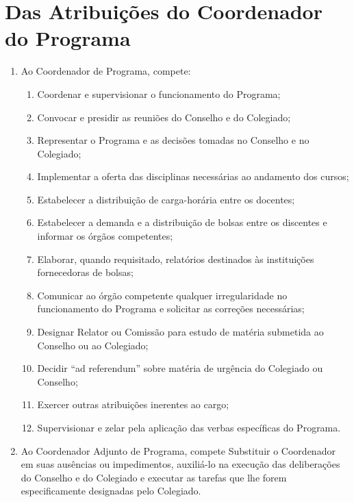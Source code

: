 \documentclass{article}
\newcommand{\grupoMenor}{Colegiado\xspace}
\newcommand{\grupoMaior}{Conselho\xspace}
\begin{document}
\section{Das Atribuições do Coordenador do Programa}
\begin{enumerate}
	\item Ao Coordenador de Programa, compete:
	\begin{enumerate}[label=\Roman*]
		\item Coordenar e supervisionar o funcionamento do Programa;
		\item Convocar e presidir as reuniões do \grupoMaior e do \grupoMenor;
		\item Representar o Programa e as decisões tomadas no \grupoMaior e no \grupoMenor;
		\item Implementar a oferta das disciplinas necessárias ao andamento dos cursos;
		\item Estabelecer a distribuição de carga-horária entre os docentes;
		\item Estabelecer a demanda e a distribuição de bolsas entre os discentes e informar os órgãos competentes;
		\item Elaborar, quando requisitado, relatórios destinados às instituições fornecedoras de bolsas;
		\item Comunicar ao órgão competente qualquer irregularidade no funcionamento do Programa e solicitar as correções necessárias;
		\item Designar Relator ou Comissão para estudo de matéria submetida ao \grupoMaior ou ao \grupoMenor;
		\item Decidir ``ad referendum'' sobre matéria de urgência do \grupoMenor ou \grupoMaior;
		\item Exercer outras atribuições inerentes ao cargo;
		\item Supervisionar e zelar pela aplicação das verbas específicas do Programa.
	\end{enumerate}
	\item Ao Coordenador Adjunto de Programa, compete Substituir o Coordenador em suas ausências ou impedimentos, auxiliá-lo na execução das deliberações do \grupoMaior e do \grupoMenor e executar as tarefas que lhe forem especificamente designadas pelo \grupoMenor.
\end{enumerate}
\end{document}
